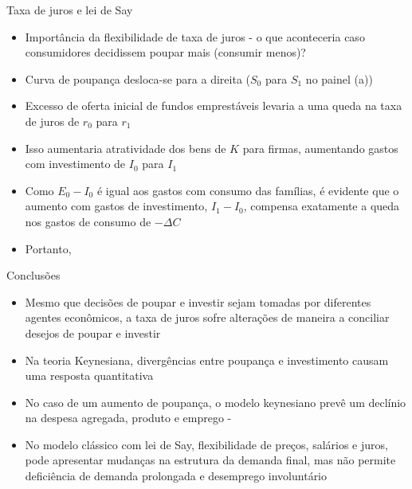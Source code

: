 \documentclass[10pt]{beamer}
\begin{document}
\begin{frame}
    {Taxa de juros e lei de Say}
    \begin{itemize}
        \item Importância da flexibilidade de taxa de juros - o que aconteceria caso consumidores decidissem poupar mais (consumir menos)?\bigskip
        \item Curva de poupança desloca-se para a direita ($S_0$ para $S_1$ no painel (a))\bigskip
        \item Excesso de oferta inicial de fundos emprestáveis levaria a uma queda na taxa de juros de $r_0$ para $r_1$\bigskip
        \item Isso aumentaria atratividade dos bens de $K$ para firmas, aumentando gastos com investimento de $I_0$ para $I_1$\bigskip
        \item Como $E_0 - I_0$ é igual aos gastos com consumo das famílias, é evidente que o aumento com gastos de investimento, $I_1 - I_0$, compensa exatamente a queda nos gastos de consumo de $-\Delta C$\bigskip
        \item Portanto, 
    \end{itemize}
\end{frame}

\begin{frame}
    {Conclusões}
    \begin{itemize}
        \item Mesmo que decisões de poupar e investir sejam tomadas por diferentes agentes econômicos, a taxa de juros sofre alterações de maneira a conciliar desejos de poupar e investir\bigskip
        \item Na teoria Keynesiana, divergências entre poupança e investimento causam uma resposta quantitativa\bigskip
        \item No caso de um aumento de poupança, o modelo keynesiano prevê um declínio na despesa agregada, produto e emprego - \bigskip
        \item No modelo clássico com lei de Say, flexibilidade de preços, salários e juros, pode apresentar mudanças na estrutura da demanda final, mas não permite deficiência de demanda prolongada e desemprego involuntário
    \end{itemize}
\end{frame}
\end{document}
